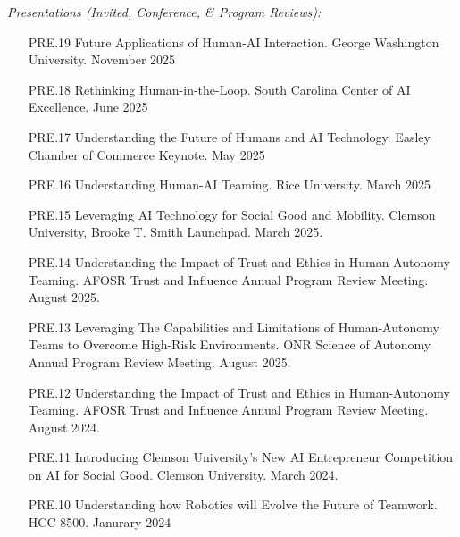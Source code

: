 \bigskip \noindent
\textit{Presentations (Invited, Conference, \& Program Reviews):}
\bigskip \noindent

\begin{itemize}[align=left, labelwidth=3em,]
\setlength\itemsep{1em}

\item[PRE.19] Future Applications of Human-AI Interaction. George Washington University. November 2025 \\

\item[PRE.18] Rethinking Human-in-the-Loop. South Carolina Center of AI Excellence. June 2025 \\

\item[PRE.17] Understanding the Future of Humans and AI Technology. Easley Chamber of Commerce Keynote. May 2025 \\

\item[PRE.16] Understanding Human-AI Teaming. Rice University. March 2025 \\

\item[PRE.15] Leveraging AI Technology for Social Good and Mobility. Clemson University, Brooke T. Smith Launchpad. March 2025. \\

\item[PRE.14] Understanding the Impact of Trust and Ethics in Human-Autonomy Teaming. AFOSR Trust and Influence Annual Program Review Meeting. August 2025. \\

\item[PRE.13] Leveraging The Capabilities and Limitations of Human-Autonomy Teams to Overcome High-Risk Environments. ONR Science of Autonomy Annual Program Review Meeting. August 2025. \\

\item[PRE.12] Understanding the Impact of Trust and Ethics in Human-Autonomy Teaming. AFOSR Trust and Influence Annual Program Review Meeting. August 2024. \\

\item[PRE.11] Introducing Clemson University's New AI Entrepreneur Competition on AI for Social Good. Clemson University. March 2024. \\

\item[PRE.10] Understanding how Robotics will Evolve the Future of Teamwork. HCC 8500. Janurary 2024


\end{itemize}
